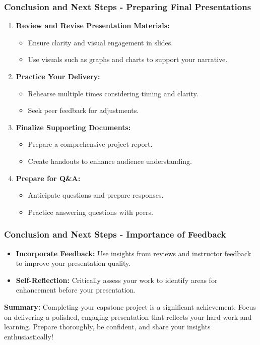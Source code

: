 \documentclass{beamer}
\begin{document}
\begin{frame}[fragile]
    \frametitle{Conclusion and Next Steps - Preparing Final Presentations}
    \begin{enumerate}
        \item \textbf{Review and Revise Presentation Materials:}
        \begin{itemize}
            \item Ensure clarity and visual engagement in slides.
            \item Use visuals such as graphs and charts to support your narrative.
        \end{itemize}
        
        \item \textbf{Practice Your Delivery:}
        \begin{itemize}
            \item Rehearse multiple times considering timing and clarity.
            \item Seek peer feedback for adjustments.
        \end{itemize}
        
        \item \textbf{Finalize Supporting Documents:}
        \begin{itemize}
            \item Prepare a comprehensive project report.
            \item Create handouts to enhance audience understanding.
        \end{itemize}
        
        \item \textbf{Prepare for Q\&A:}
        \begin{itemize}
            \item Anticipate questions and prepare responses.
            \item Practice answering questions with peers.
        \end{itemize}
    \end{enumerate}
\end{frame}

\begin{frame}[fragile]
    \frametitle{Conclusion and Next Steps - Importance of Feedback}
    \begin{itemize}
        \item \textbf{Incorporate Feedback:} Use insights from reviews and instructor feedback to improve your presentation quality.
        
        \item \textbf{Self-Reflection:} Critically assess your work to identify areas for enhancement before your presentation.
    \end{itemize}
    
    \textbf{Summary:} Completing your capstone project is a significant achievement. Focus on delivering a polished, engaging presentation that reflects your hard work and learning. Prepare thoroughly, be confident, and share your insights enthusiastically!
\end{frame}
\end{document}
